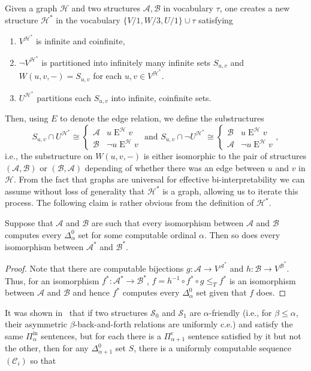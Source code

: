 \documentclass[10pt,a4paper]{amsart}
\newcommand\+[1]{\mathcal{#1}}
\renewcommand\*[1]{\mathbf{#1}}
\renewcommand\=[1]{\text{#1}}
\renewcommand\*[1]{\mathbf{#1}}
\newcommand{\A}{\mathcal{A}}
\newcommand{\B}{\mathcal{B}}
\newcommand{\Pinf}[1]{\Pi^{\mathrm{in}}_{#1}}
\newcommand{\Picom}[1]{\Pi^{\mathrm{c}}_{#1}}
\begin{document}
 Given a graph $\+H$ and two structures $\+A,\+B$ in vocabulary $\tau$, one creates a new structure $\+H^*$ in the vocabulary 
   $\{V/1, W/3, U/1\}\cup \tau$ satisfying
   \begin{enumerate}
     \item\label{it:vertset} $V^{\+H^*}$ is infinite and coinfinite,
     \item\label{it:partition} $\neg V^{\+H^*}$ is partitioned into infinitely many infinite sets $S_{u,v}$ and $W(u,v,-)=S_{u,v}$ for each $u,v\in V^{\+H^*}$.
     \item\label{it:pair} $U^{\+H^*}$ partitions each $S_{u,v}$ into infinite, coinfinite sets.
   \end{enumerate}
   Then, using $E$ to denote the edge relation, we define the substructures
   \[ S_{u,v}\cap U^{\+H^*}\cong \begin{cases} \+A & u \mathrel{E}^\+H v\\ \+B &\neg u\mathrel{E}^\+H v \end{cases}\text{ and }
      S_{u,v}\cap \neg U^{\+H^*}\cong \begin{cases} \+B & u \mathrel{E}^\+H v\\
     \+A & \neg u\mathrel{E}^\+H v \end{cases},\]
     i.e., the substructure on $W(u,v,-)$ is either isomorphic to the pair of structures $(\A,\B)$ or $(\B,\A)$ depending of whether there was an edge between $u$ and $v$ in $\+H$. From the fact that graphs are universal for effective bi-interpretability we can assume without loss of generality that $\+H^*$ is a graph, allowing us to iterate this process. The following claim is rather obvious from the definition of $\+H^*$.
     \begin{lemma}
       Suppose that $\+A$ and $\+B$ are such that every isomorphism between $\+A$ and $\+B$ computes every $\Delta^0_\alpha$ set for some computable ordinal $\alpha$. Then so does every isomorphism between $\+A^*$ and $\+B^*$.
     \end{lemma}
     \begin{proof}
       Note that there are computable bijections $g: \+A\to V^{\+A^*}$ and $h:\+B\to V^{\+B^*}$. Thus, for an isomorphism $f^*:\+A^*\to\+B^*$, $f=h^{-1}\circ f^*\circ g\leq_T f^*$ is an isomorphism between $\+A$ and $\+B$ and hence $f^*$ computes every $\Delta^0_\alpha$ set given that $f$ does.
     \end{proof}
    It was shown in~\cite[Lemma 5.1]{goncharov2005} that if two structures $\+S_0$ and $\+S_1$ are $\alpha$-friendly (i.e., for $\beta\leq \alpha$, their asymmetric $\beta$-back-and-forth relations are uniformly c.e.) and satisfy the same $\Pinf{\alpha}$ sentences, but for each there is a $\Picom{\alpha+1}$ sentence satisfied by it but not the other, then for any $\Delta^0_{\alpha+1}$ set $S$, there is a uniformly computable sequence $(\+C_i)$ so that
\end{document}
